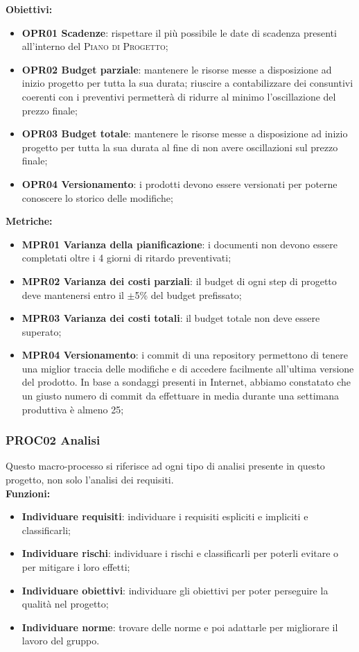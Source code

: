 \documentclass[../piano_di_qualifica.tex]{subfiles}
\begin{document}
\textbf{Obiettivi:}
\smallbreak
\begin{itemize}
	\item \textbf{OPR01 Scadenze}: rispettare il più possibile le date di scadenza presenti all'interno del \textsc{Piano di Progetto};
	\item \textbf{OPR02 Budget parziale}: mantenere le risorse messe a disposizione ad inizio progetto per tutta la sua durata; riuscire a contabilizzare dei consuntivi coerenti con i preventivi permetterà di ridurre al minimo l'oscillazione del prezzo finale;
	\item \textbf{OPR03 Budget totale}: mantenere le risorse messe a disposizione ad inizio progetto per tutta la sua durata al fine di non avere oscillazioni sul prezzo finale;
	\item \textbf{OPR04 Versionamento}: i prodotti devono essere versionati per poterne conoscere lo storico delle modifiche;
\end{itemize}

\textbf{Metriche:}
\smallbreak
\begin{itemize}
	\item \textbf{MPR01 Varianza della pianificazione}: i documenti non devono essere completati oltre i 4 giorni di ritardo preventivati;
	\item \textbf{MPR02 Varianza dei costi parziali}: il budget di ogni step di progetto deve mantenersi entro il $\pm$5\% del budget prefissato;
	\item \textbf{MPR03 Varianza dei costi totali}: il budget totale non deve essere superato;
	\item \textbf{MPR04 Versionamento}: i commit di una repository permettono di tenere una miglior traccia delle modifiche e di accedere facilmente all’ultima versione del prodotto. In base a sondaggi presenti in Internet, abbiamo constatato che un giusto numero di commit da effettuare in media durante una settimana produttiva è almeno 25;
\end{itemize}

\subsubsection{PROC02 Analisi}
Questo macro-processo si riferisce ad ogni tipo di analisi presente in questo progetto, non solo l'analisi dei requisiti.\\

\textbf{Funzioni:}
\smallbreak
\begin{itemize}
	\item \textbf{Individuare requisiti}: individuare i requisiti espliciti e impliciti e classificarli;
	\item \textbf{Individuare rischi}: individuare i rischi e classificarli per poterli evitare o per mitigare i loro effetti;
	\item \textbf{Individuare obiettivi}: individuare gli obiettivi per poter perseguire la qualità nel progetto;
	\item \textbf{Individuare norme}: trovare delle norme e poi adattarle per migliorare il lavoro del gruppo.
\end{itemize}
\end{document}
